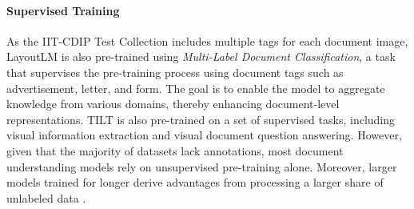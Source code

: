 

\paragraph{Supervised Training}

As the IIT-CDIP Test Collection includes multiple tags for each document image, LayoutLM is also pre-trained using \textit{Multi-Label Document Classification}, a task that supervises the pre-training process using document tags such as advertisement, letter, and form. The goal is to enable the model to aggregate knowledge from various domains, thereby enhancing document-level representations. TILT is also pre-trained on a set of supervised tasks, including visual information extraction and visual document question answering. However, given that the majority of datasets lack annotations, most document understanding models rely on unsupervised pre-training alone. Moreover, larger models trained for longer derive advantages from processing a larger share of unlabeled data \citep{raffel2020exploring}.


